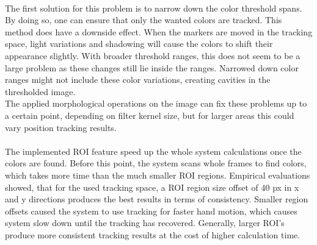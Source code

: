 \\The first solution for this problem is to narrow down the color threshold spans. By doing so, one can ensure that only the wanted colors are tracked. This method does have a downside effect. When the markers are moved in the tracking space, light variations and shadowing will cause the colors to shift their appearance slightly. With broader threshold ranges, this does not seem to be a large problem as these changes still lie inside the ranges. Narrowed down color ranges might not include these color variations, creating cavities in the thresholded image.\\ The applied morphological operations on the image can fix these problems up to a certain point, depending on filter kernel size, but for larger areas this could vary position tracking results.\\\\The implemented ROI feature speed up the whole system calculations once the colors are found. Before this point, the system scans whole frames to find colors, which takes more time than the much smaller ROI regions.
Empirical evaluations showed, that for the used tracking space, a ROI region size offset of 40 px in x and y directions produces the best results in terms of consistency. Smaller region offsets caused the system to use tracking for faster hand motion, which causes system slow down until the tracking has recovered. Generally, larger ROI's produce more consistent tracking results at the cost of higher calculation time.
